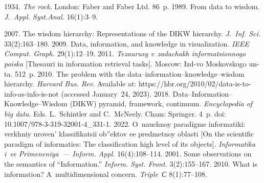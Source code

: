   


  \begin{multicols}{2}

\renewcommand{\bibname}{\protect\rmfamily References}

{\small\frenchspacing
 {%
 \begin{thebibliography}{99} 

 1934. \textit{The rock}. London: Faber and Faber Ltd. 86~p.
 1989. From data to wisdom. \textit{J.~Appl. Syst.Anal.} 16(1):3--9.

\vspace*{-2pt}

 2007. The wisdom hierarchy: Representations of the DIKW hierarchy. 
\textit{J.~Inf. Sci.} 33(2):163--180.
 2009. Data, information, and knowledge in visualization. 
\textit{IEEE Comput. Graph.} 29(1):12--19.
 2011. \textit{Tezaurusy v~zadachakh informatsionnogo poiska} 
[Thesauri in information retrieval tasks]. Moscow: Izd-vo Moskovskogo un-ta. 512~p.
 2010. The problem with the data--information--knowledge--wisdom hierarchy. 
\textit{Harvard Bus. Rev.} Available at: {\sf https://hbr.org/2010/02/data-is-to-info-as-info-is-not} 
(accessed January~24, 2023).
 2018. Data--Information--Knowledge--Wisdom (DIKW) 
pyramid, framework, continuum. \textit{Encyclopedia of big data.} Eds. L.~Schintler and 
C.~\mbox{McNeely}. Cham: Springer. 4~p.  doi: 10.1007/978-3-319-32001-4\_331-1.
 2022. O~nauchnoy paradigme informatiki: verkhniy uroven' klassifikatsii 
ob''ektov ee predmetnoy oblasti [On the scientific paradigm of informatics: The classification 
high level of its objects]. \textit{Informatika i~ee Primeneniya~--- Inform. Appl.} 16(4):108--114.
 2001. Some observations on the semantics of ``Information.'' \textit{Inform. 
Syst. Front.} 3(2):155--167.
 2010. What is information? 
A~multidimensional concern. \textit{Triple~С} 8(1):77--108.


\end{thebibliography}}}
\end{multicols}
